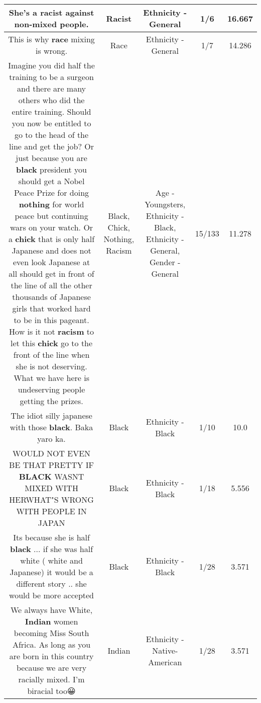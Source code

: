 \documentclass[11pt]{article}
\newlength\mylength
\begin{document}
\begin{center}
\begin{longtable}{|C{.65\mylength}|C{.30\mylength}|C{.12\mylength}|C{.12\mylength}|C{.12\mylength}|}
  \small She's a \textbf{racist} against non-mixed people.\normalsize   & Racist & Ethnicity - General & 1/6 & 16.667 \\  \hline
  \small This is why \textbf{race} mixing is wrong.\normalsize   & Race & Ethnicity - General & 1/7 & 14.286 \\  \hline
  \small Imagine you did half the training to be a surgeon and there are many others who did the entire training.  Should you now be entitled to go to the head of the line and get the job? Or just because you are \textbf{black} president you should get a Nobel Peace Prize for doing \textbf{nothing} for world peace but continuing wars on your watch.  Or a \textbf{chick} that is only half Japanese and does not even look Japanese at all should get in front of the line of all the other thousands of Japanese girls that worked hard to be in this pageant.  How is it not \textbf{racism} to let this \textbf{chick} go to the front of the line when she is not deserving.  What we have here is undeserving people getting the prizes.\normalsize   & Black, Chick, Nothing, Racism & Age - Youngsters, Ethnicity - Black, Ethnicity - General, Gender - General & 15/133 & 11.278 \\  \hline
  \small The idiot silly japanese with those \textbf{black}. Baka yaro ka.\normalsize   & Black & Ethnicity - Black & 1/10 & 10.0 \\  \hline
  \small WOULD NOT EVEN BE THAT PRETTY IF \textbf{BLACK} WASNT MIXED WITH HERWHAT"S WRONG WITH PEOPLE IN JAPAN\normalsize   & Black & Ethnicity - Black & 1/18 & 5.556 \\  \hline
  \small Its because she is half \textbf{black} ... if she was half white ( white and Japanese) it would be a different story ..  she would be more accepted\normalsize   & Black & Ethnicity - Black & 1/28 & 3.571 \\  \hline
  \small We always have White, \textbf{Indian} women becoming Miss South Africa. As long as you are born in this country because we are very racially mixed. I'm biracial too😀\normalsize   & Indian & Ethnicity - Native-American & 1/28 & 3.571 \\  \hline

\end{longtable}
\end{center}
\end{document}
